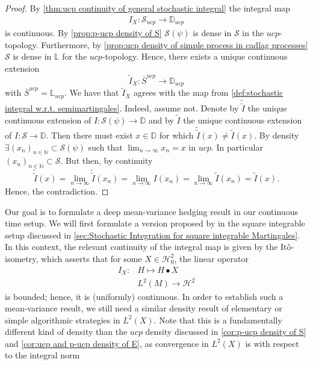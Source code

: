 \documentclass[11pt]{report}
\theoremstyle{plain} %
\theoremstyle{definition} %
\theoremstyle{remark} %
\begin{document}
\begin{proof}
    By \cref{thm:ucp continuity of general stochastic integral} the integral map
    \begin{align}
     I_X:\mathcal{S}_{ucp}\to\mathbb{D}_{ucp}   
    \end{align}
    is continuous. By \cref{prop:p-ucp density of S} \(\mathcal{S}(\psi)\) is dense in \(\mathcal{S}\) in the \(ucp\)-topology. Furthermore, by \cref{prop:ucp density of simple process in cadlag processes} \(\mathcal{S}\) is dense in \(\mathbb{L}\) for the \(ucp\)-topology. Hence, there exists a unique continuous extension 
    \begin{equation}
        \tilde{I}_X:\overline{S}^{ucp}\to\mathbb{D}_{ucp}
    \end{equation} 
    with \(\overline{S}^{ucp}=\mathbb{L}_{ucp}\). We have that \(\tilde{I}_X\) agrees with the map from \cref{def:stochastic integral w.r.t. semimartingales}. Indeed, assume not. Denote by \(\tilde{\tilde{I}}\) the unique continuous extension of \(I:\mathcal{S}(\psi)\to\mathbb{D}\) and by \(\tilde{I}\) the unique continuous extension of \(I:\mathcal{S}\to\mathbb{D}\). Then there must exist \(x\in\mathbb{D}\) for which \(\tilde{\tilde{I}}(x)\neq\tilde{I}(x)\). By density \(\exists(x_n)_{n\in\mathbb{N}}\subset\mathcal{S}(\psi)\) such that \(\lim_{n\to\infty}x_n=x\) in \(ucp\). In particular \((x_n)_{n\in\mathbb{N}}\subset\mathcal{S}\). But then, by continuity
    \begin{equation}
        \tilde{\tilde{I}}(x)=\lim_{n\to\infty}\tilde{\tilde{I}}(x_n)=\lim_{n\to\infty}I(x_n)=\lim_{n\to\infty}\tilde{I}(x_n)=\tilde{I}(x).
    \end{equation}
    Hence, the contradiction. 
\end{proof}
Our goal is to formulate a deep mean-variance hedging result in our continuous time setup. We will first formulate a version proposed by \parencite{Arandjelovic2025} in the square integrable setup discussed in \cref{sec:Stochastic Integration for square integrable Martingales}. In this context, the relevant continuity of the integral map is given by the Itô-isometry, which asserts that for some \(X\in\mathcal{H}_0^2\), the linear operator
\begin{align*}
    I_X:& H\mapsto H\bullet X\\
    &L^2(M)\to \mathcal{H}^2
\end{align*}
is bounded; hence, it is (uniformly) continuous. In order to establish such a mean-variance result, we still need a similar density result of elementary or simple algorithmic strategies in \(L^2(X)\). Note that this is a fundamentally different kind of density than the \(ucp\) density discussed in \cref{cor:p-ucp density of S} and \cref{cor:ucp and p-ucp density of E}, as convergence in \(L^2(X)\) is with respect to the integral norm 
\end{document}
